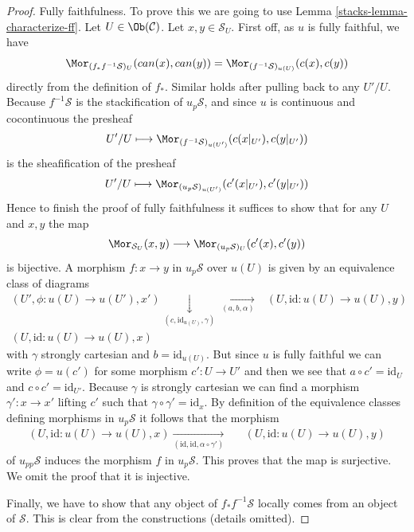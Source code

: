 \begin{proof}
\medskip\noindent
Fully faithfulness. To prove this we are going to use
Lemma \ref{stacks-lemma-characterize-ff}.
Let $U \in \Ob(\mathcal{C})$.
Let $x, y \in \mathcal{S}_U$.
First off, as $u$ is fully faithful, we have
$$
\Mor_{(f_*f^{-1}\mathcal{S})_U}(can(x), can(y))
=
\Mor_{(f^{-1}\mathcal{S})_{u(U)}}(c(x), c(y))
$$
directly from the definition of $f_*$. Similar holds after
pulling back to any $U'/U$. Because $f^{-1}\mathcal{S}$ is the
stackification of $u_p\mathcal{S}$, and since $u$ is continuous
and cocontinuous the presheaf
$$
U'/U \longmapsto
\Mor_{(f^{-1}\mathcal{S})_{u(U')}}(c(x|_{U'}), c(y|_{U'}))
$$
is the sheafification of the presheaf
$$
U'/U \longmapsto
\Mor_{(u_p\mathcal{S})_{u(U')}}(c'(x|_{U'}), c'(y|_{U'}))
$$
Hence to finish the proof of fully faithfulness it suffices
to show that for any $U$ and $x, y$ the map
$$
\Mor_{\mathcal{S}_U}(x, y)
\longrightarrow
\Mor_{(u_p\mathcal{S})_U}(c'(x), c'(y))
$$
is bijective. A morphism $f : x \to y$ in $u_p\mathcal{S}$ over $u(U)$
is given by an equivalence class of diagrams
$$
\begin{array}{cc}(U', \phi : u(U) \to u(U'), x')
\underset{(c, \text{id}_{u(U)}, \gamma)}{\downarrow}\underset{(a, b, \alpha)}{\longrightarrow} & (U, \text{id} : u(U) \to u(U), y) \\ (U, \text{id} : u(U) \to u(U), x) & \end{array}
$$
with $\gamma$ strongly cartesian and $b = \text{id}_{u(U)}$.
But since $u$ is fully faithful we can write $\phi = u(c')$ for some
morphism $c' : U \to U'$
and then we see that $a \circ c' = \text{id}_U$ and
$c \circ c' = \text{id}_{U'}$. Because $\gamma$ is strongly cartesian
we can find a morphism $\gamma' : x \to x'$ lifting $c'$ such that
$\gamma \circ \gamma' = \text{id}_x$. By definition of the equivalence
classes defining morphisms in $u_p\mathcal{S}$ it follows that
the morphism
$$
\begin{array}{ccc}(U, \text{id} : u(U) \to u(U), x)
\underset{(\text{id}, \text{id}, \alpha \circ \gamma')}{\longrightarrow} &  & (U, \text{id} : u(U) \to u(U), y)\end{array}
$$
of $u_{pp}\mathcal{S}$ induces the morphism $f$ in $u_p\mathcal{S}$.
This proves that the map is surjective. We omit the proof that it is
injective.

\medskip\noindent
Finally, we have to show that any object of $f_*f^{-1}\mathcal{S}$
locally comes from an object of $\mathcal{S}$. This is clear from the
constructions (details omitted).
\end{proof}

